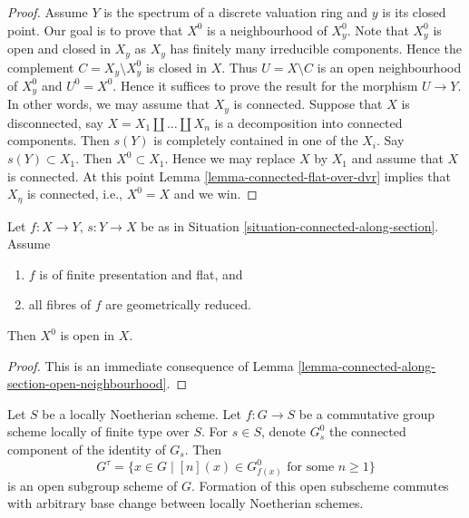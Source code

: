 \begin{proof}
\medskip\noindent
Assume $Y$ is the spectrum of a discrete valuation ring and $y$ is its closed
point. Our goal is to prove that $X^0$ is a neighbourhood of $X^0_y$.
Note that $X^0_y$ is open and closed in $X_y$ as $X_y$ has finitely
many irreducible components. Hence the complement $C = X_y \setminus X_y^0$
is closed in $X$. Thus $U = X \setminus C$ is an open neighbourhood of
$X^0_y$ and $U^0 = X^0$. Hence it suffices to prove the result for the
morphism $U \to Y$. In other words, we may assume that
$X_y$ is connected. Suppose that $X$ is disconnected, say
$X = X_1 \amalg \ldots \amalg X_n$ is a decomposition into connected
components. Then $s(Y)$ is completely contained in one of the $X_i$.
Say $s(Y) \subset X_1$. Then $X^0 \subset X_1$. Hence we may replace
$X$ by $X_1$ and assume that $X$ is connected. At this point
Lemma \ref{lemma-connected-flat-over-dvr}
implies that $X_\eta$ is connected, i.e., $X^0 = X$ and we win.
\end{proof}

\begin{lemma}
\label{lemma-connected-along-section-open}
Let $f : X \to Y$, $s : Y \to X$ be as in
Situation \ref{situation-connected-along-section}.
Assume
\begin{enumerate}
\item $f$ is of finite presentation and flat, and
\item all fibres of $f$ are geometrically reduced.
\end{enumerate}
Then $X^0$ is open in $X$.
\end{lemma}

\begin{proof}
This is an immediate consequence of
Lemma \ref{lemma-connected-along-section-open-neighbourhood}.
\end{proof}

\begin{lemma}
\label{lemma-torsion-component-locus-open}
Let $S$ be a locally Noetherian scheme. Let $f : G \to S$ be a commutative
group scheme locally of finite type over $S$. For $s \in S$, denote $G_s^0$ the
connected component of the identity of $G_s$. Then
$$
G^\tau = \{x \in G \mid [n](x) \in G_{f(x)}^0
\text{ for some }n \geq 1\}
$$
is an open subgroup scheme of $G$. Formation of this open subscheme commutes
with arbitrary base change between locally Noetherian schemes.
\end{lemma}

